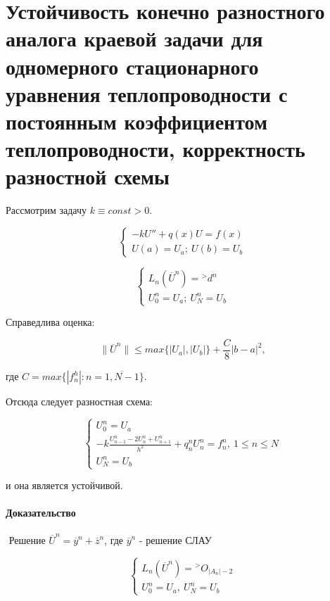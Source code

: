 \documentclass[__main__.tex]{subfiles}
\begin{document}
\section{Устойчивость конечно разностного аналога краевой задачи для одномерного стационарного уравнения теплопроводности с постоянным коэффициентом теплопроводности, корректность разностной схемы}

Рассмотрим задачу $k \equiv const > 0$.

\begin{equation}
\begin{cases}
- k U'' + q\left(x\right)U = f \left(x\right) \\
U \left(a\right) = U_a ; \ U \left(b\right) = U_b
\end{cases}
\end{equation}

\begin{equation}
\begin{cases}
L_n \left(\overline{U}^n\right) = {}^> d^n\\
U^n_0 = U_a; \ U^n_N = U_b
\end{cases}
\end{equation}

Справедлива оценка:

$$
\| \overline{U}^n \| \leq max \{ \left|U_a\right|, \left|U_b\right| \} + \frac{C}{8} \left|b-a\right|^2,
$$

где $C = max \{\left|f^h_n\right|:n = \overline{1,N-1}\}$.

Отсюда следует разностная схема:

\begin{equation}\label{46.1}
\begin{cases}
U^n_0 = U_a \\
-k \frac{U^n_{n-1} - 2 U^n_n + U^n_{n+1}}{h^2} + q^n_n U^n_n = f^n_n, \ 1 \leq n \leq N \\
U^n_N = U_b
\end{cases}
\end{equation}

и она является устойчивой.

\paragraph{Доказательство}
$ $
Решение $\overline{U}^n = \overline{y}^n + \overline{z}^n$, где $\overline{y}^n$ - решение СЛАУ

\begin{equation}
\begin{cases}
L_n \left(\overline{U}^n\right) = {}^> O_{\left|A_n\right| - 2} \\
U^n_0 = U_a, \ U^n_N = U_b
\end{cases}
\end{equation}
\end{document}

